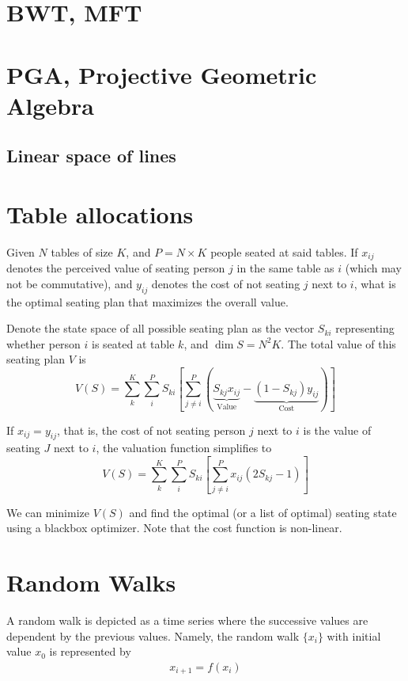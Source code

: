 \documentclass[11pt]{article}
\begin{document}
\newpage
\section{BWT, MFT}


\newpage
\section{PGA, Projective Geometric Algebra}
\subsection{Linear space of lines}

\newpage
\section{Table allocations}
Given $N$ tables of size $K$, and $P = N\times K$ people seated at said tables. If $x_{ij}$ denotes the perceived value of seating person $j$ in the same table as $i$ (which may not be commutative), and $y_{ij}$ denotes the cost of not seating $j$ next to $i$, what is the optimal seating plan that maximizes the overall value.

Denote the state space of all possible seating plan as the vector $S_{ki}$ representing whether person $i$ is seated at table $k$, and $\dim S = N^2 K$. The total value of this seating plan $V$ is
\[
    V(S) = \sum_{k}^K \sum_{i}^P S_{ki} \left[\sum_{j\neq i}^P \left( \underbrace{S_{kj} x_{ij}}_{\text{Value}} - \underbrace{(1 - S_{kj}) y_{ij} }_{\text{Cost}} \right) \right]
\]

If $x_{ij} = y_{ij}$, that is, the cost of not seating person $j$ next to $i$ is the value of seating $J$ next to $i$, the valuation function simplifies to
\[
    V(S) = \sum_{k}^K \sum_{i}^P S_{ki} \left[\sum_{j\neq i}^P x_{ij} (2S_{kj} - 1) \right]
\]

We can minimize $V(S)$ and find the optimal (or a list of optimal) seating state using a blackbox optimizer. Note that the cost function is non-linear.


\newpage
\section{Random Walks}

A random walk is depicted as a time series where the successive values are dependent by the previous values. Namely, the random walk $\{x_i\}$ with initial value $x_0$ is represented by
\begin{align*}
    x_{i+1} = f(x_i)
\end{align*}
\end{document}
